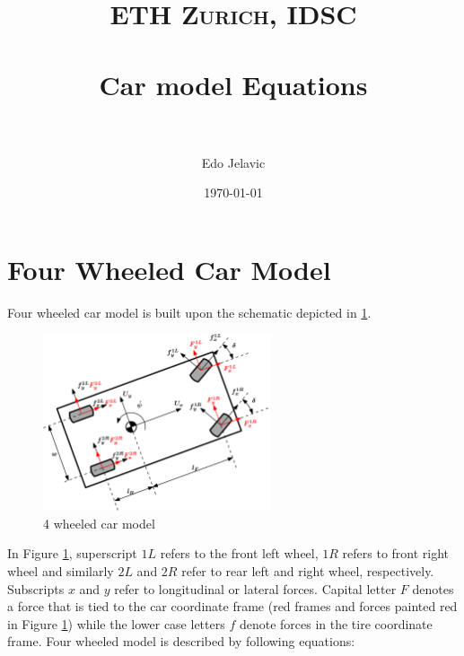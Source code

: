 \documentclass[paper=a4, fontsize=11pt]{scrartcl} %
\title{	
\normalfont \normalsize 
\textsc{ETH Zurich, IDSC} \\ [25pt] %
\horrule{0.5pt} \\[0.4cm] %
\huge Car model Equations \\ %
\horrule{2pt} \\[0.5cm] %
}
\author{Edo Jelavic} %
\date{\normalsize\today} %
\numberwithin{equation}{section} %
\numberwithin{figure}{section} %
\numberwithin{table}{section} %
\begin{document}
\maketitle %



\section{Four Wheeled Car Model} \label{FourWheelModel}

Four wheeled car model is built upon the schematic depicted in \ref{4wheelCar}.

\begin{figure}[h!]
	\centering
	\includegraphics[width=0.6\textwidth]{drawings/4wheelCar.png}
	\caption{4 wheeled car model}
	\label{4wheelCar}
\end{figure}

In Figure \ref{4wheelCar}, superscript $1L$ refers to the front left wheel, $1R$ refers to front right wheel and similarly $2L$ and $2R$ refer to rear left and right wheel, respectively. Subscripts $x$ and $y$ refer to longitudinal or lateral forces. Capital letter $F$ denotes a force that is tied to the car coordinate frame (red frames and forces painted red in Figure \ref{4wheelCar}) while the lower case letters $f$ denote forces in the tire coordinate frame. Four wheeled model is described by following equations:
\end{document}
